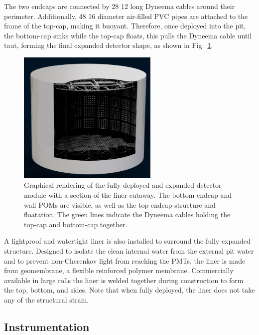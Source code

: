The two endcaps are connected by 28 \unit{12}{} long Dyneema cables around their
perimeter. Additionally, 48 \unit{16}{} diameter air-filled PVC pipes are attached to
the frame of the top-cap, making it buoyant. Therefore, once deployed into the pit, the bottom-cap
sinks while the top-cap floats, this pulls the Dyneema cable until taut, forming the final
expanded detector shape, as shown in Fig.~\ref{fig:chips_render}.

\begin{figure} %
    \includegraphics[width=0.6\textwidth]{diagrams/4-chips/chips_render_1.png}
    \caption[Graphical rendering of the \chipsfive detector]
    {Graphical rendering of the fully deployed and expanded \chipsfive detector module with a
        section of the liner cutaway. The bottom endcap and wall POMs are visible, as well as the
        top endcap structure and floatation. The green lines indicate the Dyneema cables holding
        the top-cap and bottom-cap together.}
    \label{fig:chips_render}
\end{figure}

A lightproof and watertight liner is also installed to surround the fully expanded structure.
Designed to isolate the clean internal water from the external pit water and to prevent
non-Cherenkov light from reaching the PMTs, the liner is made from geomembrane, a flexible
reinforced polymer membrane. Commercially available in large rolls the liner is welded together
during construction to form the top, bottom, and sides. Note that when fully deployed, the liner
does not take any of the structural strain.

\subsection{Instrumentation} %
\label{sec:chips_detector_instrumentation} %

